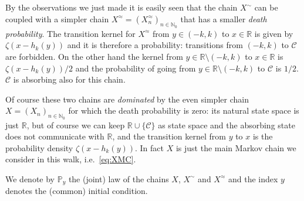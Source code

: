\documentclass[reqno,11pt]{amsart}
\numberwithin{equation}{section}
\newcommand{\cC}{{\ensuremath{\mathcal C}} }
\newcommand{\bbN}{{\ensuremath{\mathbb N}} }
\newcommand{\bbP}{{\ensuremath{\mathbb P}} }
\newcommand{\bbR}{{\ensuremath{\mathbb R}} }
\newcommand{\gz}{\zeta}
\begin{document}
\medskip

By the observations we just made it is easily seen that  the chain $X^\sim$ can be coupled with a  simpler chain $X^\approx=
( X^\approx_n)_{n\in\bbN_0}$ that has a smaller \emph{death probability}.
The transition kernel for $X^\approx$ from $y\in (-k,k)$ to $x\in \bbR$ is given by
$\gz(x-h_k(y))$ and it is therefore a probability: transitions from $(-k,k)$ to $\cC$ are forbidden.
On the other hand the kernel from $y \in \bbR \setminus (-k,k)$ to $x \in \bbR$ is $\gz(x-h_k(y))/2$ and  
the probability of going from $y \in \bbR \setminus (-k,k)$
to $\cC$ is $1/2$. $\cC$ is absorbing also for this chain.



\medskip

Of course these two chains are \emph{dominated} by the even simpler chain $X=
( X_n)_{n\in\bbN_0}$ for which the death probability is zero: its natural state space is just $\bbR$, but of course 
we can keep $\bbR \cup \{\cC\}$ as state space and the absorbing state does not communicate with $\bbR$,  and the transition kernel from $y$ to $x$ is the probability density $\gz(x-h_k(y))$. In fact $X$ is just the main Markov chain we consider in this walk, i.e.\ \eqref{eq:XMC}. 

We denote by $\bbP_y$ the (joint) law of the chains $X$, $X^\sim$ and $X^\approx$ and the index $y$
denotes the (common) initial condition.

\medskip
\end{document}
